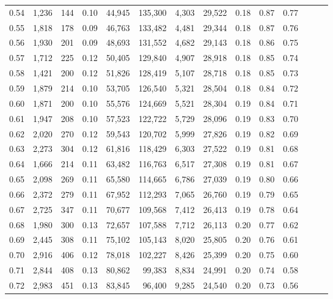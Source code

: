 \begin{tabular}{rrrrrrrrrrrrrr}
0.54 &  1,236 &    144 &  0.10 &   44,945 &  135,300 &   4,303 &  29,522 &  0.18 &  0.87 &      0.77 \\
0.55 &  1,818 &    178 &  0.09 &   46,763 &  133,482 &   4,481 &  29,344 &  0.18 &  0.87 &      0.76 \\
0.56 &  1,930 &    201 &  0.09 &   48,693 &  131,552 &   4,682 &  29,143 &  0.18 &  0.86 &      0.75 \\
0.57 &  1,712 &    225 &  0.12 &   50,405 &  129,840 &   4,907 &  28,918 &  0.18 &  0.85 &      0.74 \\
0.58 &  1,421 &    200 &  0.12 &   51,826 &  128,419 &   5,107 &  28,718 &  0.18 &  0.85 &      0.73 \\
0.59 &  1,879 &    214 &  0.10 &   53,705 &  126,540 &   5,321 &  28,504 &  0.18 &  0.84 &      0.72 \\
0.60 &  1,871 &    200 &  0.10 &   55,576 &  124,669 &   5,521 &  28,304 &  0.19 &  0.84 &      0.71 \\
0.61 &  1,947 &    208 &  0.10 &   57,523 &  122,722 &   5,729 &  28,096 &  0.19 &  0.83 &      0.70 \\
0.62 &  2,020 &    270 &  0.12 &   59,543 &  120,702 &   5,999 &  27,826 &  0.19 &  0.82 &      0.69 \\
0.63 &  2,273 &    304 &  0.12 &   61,816 &  118,429 &   6,303 &  27,522 &  0.19 &  0.81 &      0.68 \\
0.64 &  1,666 &    214 &  0.11 &   63,482 &  116,763 &   6,517 &  27,308 &  0.19 &  0.81 &      0.67 \\
0.65 &  2,098 &    269 &  0.11 &   65,580 &  114,665 &   6,786 &  27,039 &  0.19 &  0.80 &      0.66 \\
0.66 &  2,372 &    279 &  0.11 &   67,952 &  112,293 &   7,065 &  26,760 &  0.19 &  0.79 &      0.65 \\
0.67 &  2,725 &    347 &  0.11 &   70,677 &  109,568 &   7,412 &  26,413 &  0.19 &  0.78 &      0.64 \\
0.68 &  1,980 &    300 &  0.13 &   72,657 &  107,588 &   7,712 &  26,113 &  0.20 &  0.77 &      0.62 \\
0.69 &  2,445 &    308 &  0.11 &   75,102 &  105,143 &   8,020 &  25,805 &  0.20 &  0.76 &      0.61 \\
0.70 &  2,916 &    406 &  0.12 &   78,018 &  102,227 &   8,426 &  25,399 &  0.20 &  0.75 &      0.60 \\
0.71 &  2,844 &    408 &  0.13 &   80,862 &   99,383 &   8,834 &  24,991 &  0.20 &  0.74 &      0.58 \\
0.72 &  2,983 &    451 &  0.13 &   83,845 &   96,400 &   9,285 &  24,540 &  0.20 &  0.73 &      0.56 \\

\end{tabular}
